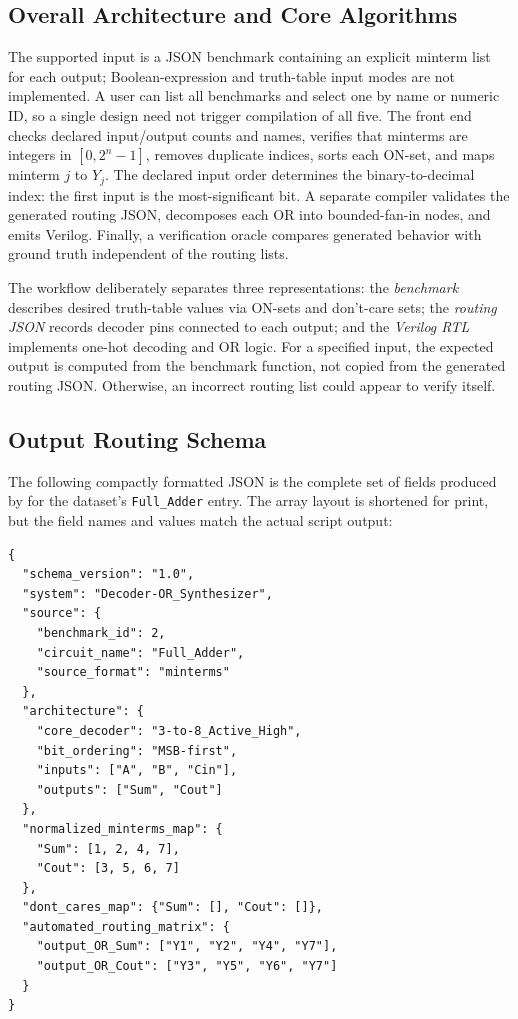 \documentclass[runningheads]{llncs}
\begin{document}
\subsection{Overall Architecture and Core Algorithms}
The supported input is a JSON benchmark containing an explicit minterm list for each output; Boolean-expression and truth-table input modes are not implemented. A user can list all benchmarks and select one by name or numeric ID, so a single design need not trigger compilation of all five. The front end checks declared input/output counts and names, verifies that minterms are integers in $[0,2^n-1]$, removes duplicate indices, sorts each ON-set, and maps minterm $j$ to $Y_j$. The declared input order determines the binary-to-decimal index: the first input is the most-significant bit. A separate compiler validates the generated routing JSON, decomposes each OR into bounded-fan-in nodes, and emits Verilog. Finally, a verification oracle compares generated behavior with ground truth independent of the routing lists.

The workflow deliberately separates three representations: the \emph{benchmark} describes desired truth-table values via ON-sets and don't-care sets; the \emph{routing JSON} records decoder pins connected to each output; and the \emph{Verilog RTL} implements one-hot decoding and OR logic. For a specified input, the expected output is computed from the benchmark function, not copied from the generated routing JSON. Otherwise, an incorrect routing list could appear to verify itself.

\subsection{Output Routing Schema}
The following compactly formatted JSON is the complete set of fields produced by  for the dataset's \texttt{Full\_Adder} entry. The array layout is shortened for print, but the field names and values match the actual script output:

\begin{verbatim}
{
  "schema_version": "1.0",
  "system": "Decoder-OR_Synthesizer",
  "source": {
    "benchmark_id": 2,
    "circuit_name": "Full_Adder",
    "source_format": "minterms"
  },
  "architecture": {
    "core_decoder": "3-to-8_Active_High",
    "bit_ordering": "MSB-first",
    "inputs": ["A", "B", "Cin"],
    "outputs": ["Sum", "Cout"]
  },
  "normalized_minterms_map": {
    "Sum": [1, 2, 4, 7],
    "Cout": [3, 5, 6, 7]
  },
  "dont_cares_map": {"Sum": [], "Cout": []},
  "automated_routing_matrix": {
    "output_OR_Sum": ["Y1", "Y2", "Y4", "Y7"],
    "output_OR_Cout": ["Y3", "Y5", "Y6", "Y7"]
  }
}
\end{verbatim}
\end{document}
